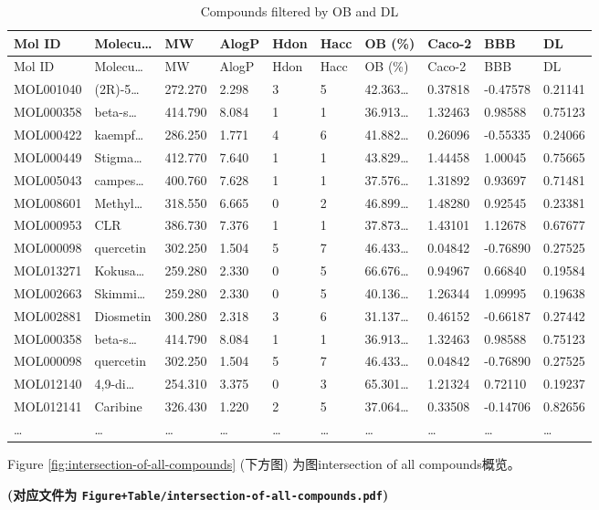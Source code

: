 \documentclass[
]{article}
\begin{document}
\begin{longtable}[]{@{}llllllllll@{}}
\caption{\label{tab:Compounds-filtered-by-OB-and-DL}Compounds filtered by OB and DL}\tabularnewline
\toprule
Mol ID & Molecu\ldots{} & MW & AlogP & Hdon & Hacc & OB (\%) & Caco-2 & BBB & DL\tabularnewline
\midrule
\endfirsthead
\toprule
Mol ID & Molecu\ldots{} & MW & AlogP & Hdon & Hacc & OB (\%) & Caco-2 & BBB & DL\tabularnewline
\midrule
\endhead
MOL001040 & (2R)-5\ldots{} & 272.270 & 2.298 & 3 & 5 & 42.363\ldots{} & 0.37818 & -0.47578 & 0.21141\tabularnewline
MOL000358 & beta-s\ldots{} & 414.790 & 8.084 & 1 & 1 & 36.913\ldots{} & 1.32463 & 0.98588 & 0.75123\tabularnewline
MOL000422 & kaempf\ldots{} & 286.250 & 1.771 & 4 & 6 & 41.882\ldots{} & 0.26096 & -0.55335 & 0.24066\tabularnewline
MOL000449 & Stigma\ldots{} & 412.770 & 7.640 & 1 & 1 & 43.829\ldots{} & 1.44458 & 1.00045 & 0.75665\tabularnewline
MOL005043 & campes\ldots{} & 400.760 & 7.628 & 1 & 1 & 37.576\ldots{} & 1.31892 & 0.93697 & 0.71481\tabularnewline
MOL008601 & Methyl\ldots{} & 318.550 & 6.665 & 0 & 2 & 46.899\ldots{} & 1.48280 & 0.92545 & 0.23381\tabularnewline
MOL000953 & CLR & 386.730 & 7.376 & 1 & 1 & 37.873\ldots{} & 1.43101 & 1.12678 & 0.67677\tabularnewline
MOL000098 & quercetin & 302.250 & 1.504 & 5 & 7 & 46.433\ldots{} & 0.04842 & -0.76890 & 0.27525\tabularnewline
MOL013271 & Kokusa\ldots{} & 259.280 & 2.330 & 0 & 5 & 66.676\ldots{} & 0.94967 & 0.66840 & 0.19584\tabularnewline
MOL002663 & Skimmi\ldots{} & 259.280 & 2.330 & 0 & 5 & 40.136\ldots{} & 1.26344 & 1.09995 & 0.19638\tabularnewline
MOL002881 & Diosmetin & 300.280 & 2.318 & 3 & 6 & 31.137\ldots{} & 0.46152 & -0.66187 & 0.27442\tabularnewline
MOL000358 & beta-s\ldots{} & 414.790 & 8.084 & 1 & 1 & 36.913\ldots{} & 1.32463 & 0.98588 & 0.75123\tabularnewline
MOL000098 & quercetin & 302.250 & 1.504 & 5 & 7 & 46.433\ldots{} & 0.04842 & -0.76890 & 0.27525\tabularnewline
MOL012140 & 4,9-di\ldots{} & 254.310 & 3.375 & 0 & 3 & 65.301\ldots{} & 1.21324 & 0.72110 & 0.19237\tabularnewline
MOL012141 & Caribine & 326.430 & 1.220 & 2 & 5 & 37.064\ldots{} & 0.33508 & -0.14706 & 0.82656\tabularnewline
\ldots{} & \ldots{} & \ldots{} & \ldots{} & \ldots{} & \ldots{} & \ldots{} & \ldots{} & \ldots{} & \ldots{}\tabularnewline
\bottomrule
\end{longtable}

Figure \ref{fig:intersection-of-all-compounds} (下方图) 为图intersection of all compounds概览。

\textbf{(对应文件为 \texttt{Figure+Table/intersection-of-all-compounds.pdf})}
\end{document}
